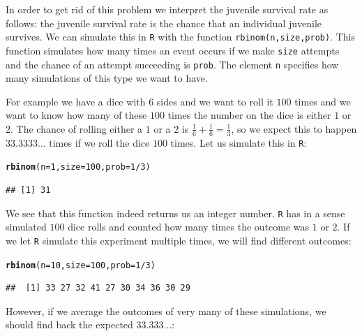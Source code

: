 \documentclass{article}\usepackage[]{graphicx}\usepackage[]{color}
\makeatletter
\newcommand{\hlnum}[1]{\textcolor[rgb]{0.686,0.059,0.569}{#1}}%
\newcommand{\hlopt}[1]{\textcolor[rgb]{0,0,0}{#1}}%
\newcommand{\hlstd}[1]{\textcolor[rgb]{0.345,0.345,0.345}{#1}}%
\newcommand{\hlkwc}[1]{\textcolor[rgb]{0.333,0.667,0.333}{#1}}%
\newcommand{\hlkwd}[1]{\textcolor[rgb]{0.737,0.353,0.396}{\textbf{#1}}}%
\newenvironment{kframe}{%
 \def\at@end@of@kframe{}%
 \ifinner\ifhmode%
  \def\at@end@of@kframe{\end{minipage}}%
  \begin{minipage}{\columnwidth}%
 \fi\fi%
 \def\FrameCommand##1{\hskip\@totalleftmargin \hskip-\fboxsep
 \colorbox{shadecolor}{##1}\hskip-\fboxsep
     \hskip-\linewidth \hskip-\@totalleftmargin \hskip\columnwidth}%
 \MakeFramed {\advance\hsize-\width
   \@totalleftmargin\z@ \linewidth\hsize
   \@setminipage}}%
 {\par\unskip\endMakeFramed%
 \at@end@of@kframe}
\newenvironment{knitrout}{}{} %
\makeatother
\begin{document}
In order to get rid of this problem we interpret the juvenile survival rate as follows: the juvenile survival rate is the chance that an individual juvenile survives. We can simulate this in \texttt{R} with the function \texttt{rbinom(n,size,prob)}. This function simulates how many times an event occurs if we make \texttt{size} attempts and the chance of an attempt succeeding is \texttt{prob}. The element \texttt{n} specifies how many simulations of this type we want to have.

For example we have a dice with 6 sides and we want to roll it $100$ times and we want to know how many of these $100$ times the number on the dice is either $1$ or $2$. The chance of rolling either a $1$ or a $2$ is $\frac{1}{6}+\frac{1}{6}=\frac{1}{3}$, so we expect this to happen $33.3333\dots$ times if we roll the dice $100$ times. Let us simulate this in \texttt{R}:
\begin{knitrout}
\color{fgcolor}\begin{kframe}
\begin{alltt}
\hlkwd{rbinom}\hlstd{(}\hlkwc{n}\hlstd{=}\hlnum{1}\hlstd{,}\hlkwc{size}\hlstd{=}\hlnum{100}\hlstd{,}\hlkwc{prob}\hlstd{=}\hlnum{1}\hlopt{/}\hlnum{3}\hlstd{)}
\end{alltt}
\begin{verbatim}
## [1] 31
\end{verbatim}
\end{kframe}
\end{knitrout}
We see that this function indeed returns us an integer number. \texttt{R} has in a sense simulated $100$ dice rolls and counted how many times the outcome was $1$ or $2$. If we let \texttt{R} simulate this experiment multiple times, we will find different outcomes:
\begin{knitrout}
\color{fgcolor}\begin{kframe}
\begin{alltt}
\hlkwd{rbinom}\hlstd{(}\hlkwc{n}\hlstd{=}\hlnum{10}\hlstd{,}\hlkwc{size}\hlstd{=}\hlnum{100}\hlstd{,}\hlkwc{prob}\hlstd{=}\hlnum{1}\hlopt{/}\hlnum{3}\hlstd{)}
\end{alltt}
\begin{verbatim}
##  [1] 33 27 32 41 27 30 34 36 30 29
\end{verbatim}
\end{kframe}
\end{knitrout}
However, if we average the outcomes of very many of these simulations, we should find back the expected $33.333\dots$:
\end{document}
